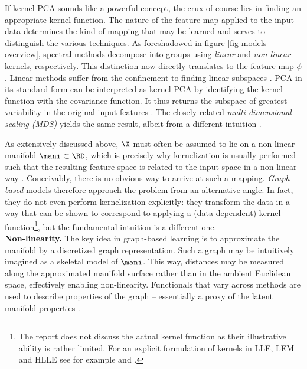 If kernel PCA sounds like a powerful concept, the crux of course lies in 
finding an appropriate kernel function.
The nature of the feature map applied to the input data determines the kind of 
mapping that may be learned and serves to distinguish the various techniques.
As foreshadowed in figure \ref{fig-models-overview}, spectral methods decompose 
into groups using \textit{linear} and \textit{non-linear} kernels, respectively.
This distinction now directly translates to the feature map $\phi$.
Linear methods suffer from the confinement to finding linear subspaces \citep{vandermaatenetal2009}.
PCA in its standard form can be interpreted as kernel PCA by identifying the 
kernel function with the covariance function.
It thus returns the subspace of greatest variability in the original input 
features \citep{hametal2003}.
The closely related \textit{multi-dimensional scaling (MDS)} yields the 
same result, albeit from a different intuition \citep{sauletal2006}.

As extensively discussed above, $\X$ must often be 
assumed to lie on a non-linear manifold $\mani \subset \RD$, which is precisely 
why kernelization is usually performed such that the resulting feature space is 
related to the input space in a non-linear way \citep{schoelkopfetal1998}.
Conceivably, there is no obvious way to arrive at such a mapping.
\textit{Graph-based} models therefore approach the problem from an alternative 
angle.
In fact, they do not even perform kernelization explicitly: they transform the 
data in a way that can be shown to correspond to applying a (data-dependent) 
kernel function\footnote{
The report does not discuss the actual kernel function as their illustrative 
ability is rather limited.
For an explicit formulation of kernels in LLE, LEM and HLLE see for example \citet{bengioetal2004} and \citet{weinbergeretal2004}.
}, 
but the fundamental intuition is a different one. 
\\

\textbf{Non-linearity.} 
The key idea in graph-based learning is to approximate the manifold by a 
discretized graph representation.
Such a graph may be intuitively imagined as a skeletal model of $\mani$.
This way, distances may be measured along the approximated manifold 
surface rather than in the ambient Euclidean space, effectively enabling 
non-linearity.
Functionals that vary across methods are used to describe properties of the 
graph -- essentially a proxy of the latent manifold properties 
\citep{sauletal2006}.
\\

